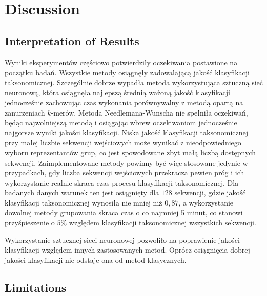 \documentclass{article}
\newcommand{\temporary}[1]{
    \begin{tcolorbox}[colframe=red, colback=white, title={\textbf{WERSJA PO POLSKU}}, sharp corners=south]
        #1
    \end{tcolorbox}
}
\begin{document}
    \section{Discussion}

        \subsection{Interpretation of Results}

            \temporary{
                Wyniki eksperymentów częściowo potwierdziły oczekiwania postawione na początku badań. Wszystkie metody osiągnęły zadowalającą jakość klasyfikacji taksonomicznej. Szczególnie dobrze wypadła metoda wykorzystująca sztuczną sieć neuronową, która osiągnęła najlepszą średnią ważoną jakość klasyfikacji jednocześnie zachowując czas wykonania porównywalny z metodą opartą na zanurzeniach $k$-merów. Metoda Needlemana-Wunscha nie spełniła oczekiwań, będąc najwolniejszą metodą i osiągając wbrew oczekiwaniom jednocześnie najgorsze wyniki jakości klasyfikacji. Niska jakość klasyfikacji taksonomicznej przy małej liczbie sekwencji wejściowych może wynikać z nieodpowiedniego wyboru reprezentantów grup, co jest spowodowane zbyt małą liczbą dostępnych sekwencji. Zaimplementowane metody powinny być więc stosowane jedynie w przypadkach, gdy liczba sekwencji wejściowych przekracza pewien próg i ich wykorzystanie realnie skraca czas procesu klasyfikacji taksonomicznej. Dla badanych danych warunek ten jest osiągnięty dla $128$ sekwencji, gdzie jakość klasyfikacji taksonomicznej wynosiła nie mniej niż $0,87$, a wykorzystanie dowolnej metody grupowania skraca czas o co najmniej 5 minut, co stanowi przyśpieszenie o $5\%$ względem klasyfikacji taksonomicznej wszystkich sekwencji.
            }

            \temporary{
                Wykorzystanie sztucznej sieci neuronowej pozwoliło na poprawienie jakości klasyfikacji względem innych zastosowanych metod. Oprócz osiągnięcia dobrej jakości klasyfikacji nie odstaje ona od metod klasycznych.
            }

        \subsection{Limitations}
\end{document}
